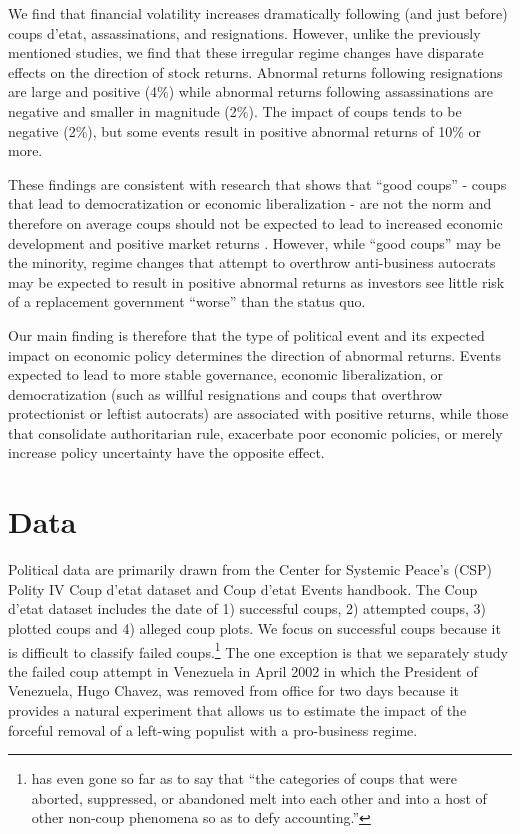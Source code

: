 \documentclass[12pt,final,fleqn]{article}
\theoremstyle{plain}
\begin{document}
We find that financial volatility increases dramatically following (and just before) coups d'etat, assassinations, and resignations. However, unlike the previously mentioned studies, we find that these irregular regime changes have disparate effects on the direction of stock returns. Abnormal returns following resignations are large and positive (4\%) while abnormal returns following assassinations are negative and smaller in magnitude (2\%). The impact of coups tends to be negative (2\%), but some events result in positive abnormal returns of 10\% or more. 

These findings are consistent with research that shows that ``good coups'' - coups that lead to democratization or economic liberalization - are not the norm and therefore on average coups should not be expected to lead to increased economic development and positive market returns \citep{derpanopoulos2015coups, marinov2014coups, powell2011global, thyne2016coup, varol2011democratic}. However, while ``good coups'' may be the minority, regime changes that attempt to overthrow anti-business autocrats may be expected to result in positive abnormal returns as investors see little risk of a replacement government ``worse'' than the status quo.

Our main finding is therefore that the type of political event and its expected impact on economic policy determines the direction of abnormal returns. Events expected to lead to more stable governance, economic liberalization, or democratization (such as willful resignations and coups that overthrow protectionist or leftist autocrats) are associated with positive returns, while those that consolidate authoritarian rule, exacerbate poor economic policies, or merely increase policy uncertainty have the opposite effect.

\section{Data}
Political data are primarily drawn from the Center for Systemic Peace's (CSP) Polity IV Coup d'etat dataset and Coup d'etat Events handbook. The Coup d'etat dataset includes the date of 1) successful coups, 2) attempted coups, 3) plotted coups and 4) alleged coup plots. We focus on successful coups because it is difficult to classify failed coups.\footnote{\citet[p. 617]{needler1966political} has even gone so far as to say that ``the categories of coups that were aborted, suppressed, or abandoned melt into each other and into a host of other non-coup phenomena so as to defy accounting.''} The one exception is that we separately study the failed coup attempt in Venezuela in April 2002 in which the President of Venezuela, Hugo Chavez, was removed from office for two days because it provides a natural experiment that allows us to estimate the impact of the forceful removal of a left-wing populist with a pro-business regime. 
\end{document}
